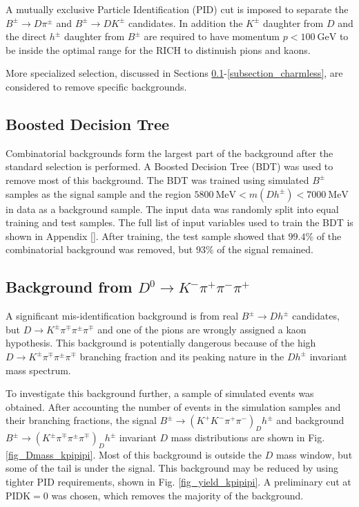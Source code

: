 \documentclass[12pt, a4paper, notitlepage, onecolumn]{article}
\numberwithin{equation}{section}
\begin{document}
A mutually exclusive Particle Identification (PID) cut is imposed to separate the $B^\pm\to D\pi^\pm$ and $B^\pm\to DK^\pm$ candidates. In addition the $K^\pm$ daughter from $D$ and the direct $h^\pm$ daughter from $B^\pm$ are required to have momentum $p < \SI{100}{\giga\eV}$ to be inside the optimal range for the RICH to distinuish pions and kaons.

More specialized selection, discussed in Sections \ref{subsection_BDT}-\ref{subsection_charmless}, are considered to remove specific backgrounds.

\subsection{Boosted Decision Tree}
\label{subsection_BDT}
\noindent Combinatorial backgrounds form the largest part of the background after the standard selection is performed. A Boosted Decision Tree (BDT) was used to remove most of this background. The BDT was trained using simulated $B^\pm$ samples as the signal sample and the region $\SI{5800}{\mega\eV} < m(Dh^\pm) < \SI{7000}{\mega\eV}$ in data as a background sample. The input data was randomly split into equal training and test samples. The full list of input variables used to train the BDT is shown in Appendix \ref{}. After training, the test sample showed that $99.4\%$ of the combinatorial background was removed, but $93\%$ of the signal remained.

\subsection{Background from \texorpdfstring{$D^0\to K^-\pi^+\pi^-\pi^+$}{D->Kpipipi}}
\label{subsection_kpipipi}
\noindent A significant mis-identification background is from real $B^\pm\to Dh^\pm$ candidates, but $D\to K^\pm\pi^\mp\pi^\pm\pi^\mp$ and one of the pions are wrongly assigned a kaon hypothesis. This background is potentially dangerous because of the high $D\to K^\pm\pi^\mp\pi^\pm\pi^\mp$ branching fraction and its peaking nature in the $Dh^\pm$ invariant mass spectrum.

To investigate this background further, a sample of simulated events was obtained. After accounting the number of events in the simulation samples and their branching fractions, the signal $B^\pm\to(K^+K^-\pi^+\pi^-)_Dh^\pm$ and background $B^\pm\to(K^\pm\pi^\mp\pi^\pm\pi^\mp)_Dh^\pm$ invariant $D$ mass distributions are shown in Fig. \ref{fig_Dmass_kpipipi}. Most of this background is outside the $D$ mass window, but some of the tail is under the signal. This background may be reduced by using tighter PID requirements, shown in Fig. \ref{fig_yield_kpipipi}. A preliminary cut at $\text{PIDK} = 0$ was chosen, which removes the majority of the background.
\end{document}
